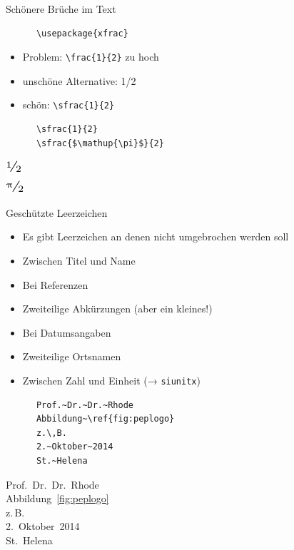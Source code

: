 \begin{frame}[fragile]{Schönere Brüche im Text}
  \begin{Packages}
    \begin{lstlisting}
      \usepackage{xfrac}
    \end{lstlisting}
  \end{Packages}
  \begin{itemize}
    \item Problem: \lstinline+\frac{1}{2}+ zu hoch
    \item unschöne Alternative: 1/2
    \item schön: \lstinline+\sfrac{1}{2}+
  \end{itemize}
  \begin{CodeExample}{0.5}
    \begin{lstlisting}
      \sfrac{1}{2}
      \sfrac{$\mathup{\pi}$}{2}
    \end{lstlisting}
  \CodeResult
    \includegraphics[scale=0.8]{figures/xfrac.pdf}
  \end{CodeExample}
\end{frame}

\begin{frame}[fragile]{Geschützte Leerzeichen}
  \begin{itemize}
    \item Es gibt Leerzeichen an denen nicht umgebrochen werden soll
    \item Zwischen Titel und Name
    \item Bei Referenzen
    \item Zweiteilige Abkürzungen (aber ein kleines!)
    \item Bei Datumsangaben
    \item Zweiteilige Ortsnamen
    \item Zwischen Zahl und Einheit (→ \texttt{siunitx})
  \end{itemize}
  \begin{CodeExample}{0.5}
    \begin{lstlisting}
      Prof.~Dr.~Dr.~Rhode
      Abbildung~\ref{fig:peplogo}
      z.\,B.
      2.~Oktober~2014
      St.~Helena
    \end{lstlisting}
    \CodeResult
      Prof.~Dr.~Dr.~Rhode \\
      Abbildung~\ref{fig:peplogo} \\
      z.\,B. \\
      2.~Oktober~2014 \\
      St.~Helena
  \end{CodeExample}
\end{frame}


